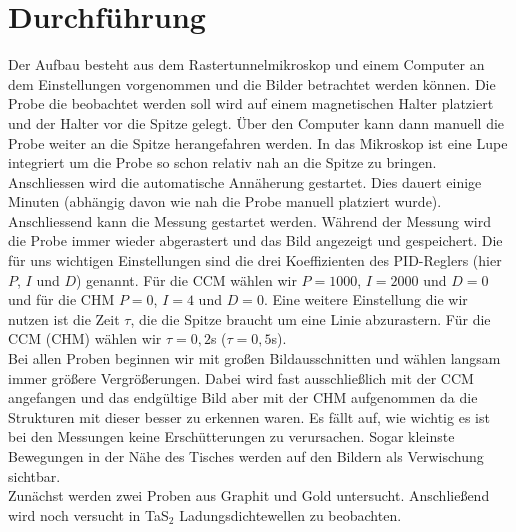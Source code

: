 \section{Durchführung}
Der Aufbau besteht aus dem Rastertunnelmikroskop und einem Computer an dem Einstellungen vorgenommen und die Bilder betrachtet werden können. Die Probe die beobachtet werden soll wird auf einem magnetischen Halter platziert und der Halter vor die Spitze gelegt. Über den Computer kann dann manuell die Probe weiter an die Spitze herangefahren werden. In das Mikroskop ist eine Lupe integriert um die Probe so schon relativ nah an die Spitze zu bringen. Anschliessen wird die automatische Annäherung gestartet. Dies dauert einige Minuten (abhängig davon wie nah die Probe manuell platziert wurde).\\
Anschliessend kann die Messung gestartet werden. Während der Messung wird die Probe immer wieder abgerastert und das Bild angezeigt und gespeichert. Die für uns wichtigen Einstellungen sind die drei Koeffizienten des PID-Reglers (hier $P$, $I$ und $D$) genannt. Für die CCM wählen wir $P=1000$, $I=2000$ und $D=0$ und für die CHM $P=0$, $I=4$ und $D=0$. Eine weitere Einstellung die wir nutzen ist die Zeit $\tau$, die die Spitze braucht um eine Linie abzurastern. Für die CCM (CHM) wählen wir $\tau=0,2$s ($\tau=0,5$s).\\
Bei allen Proben beginnen wir mit großen Bildausschnitten und wählen langsam immer größere Vergrößerungen. Dabei wird fast ausschließlich mit der CCM angefangen und das endgültige Bild aber mit der CHM aufgenommen da die Strukturen mit dieser besser zu erkennen waren. Es fällt auf, wie wichtig es ist bei den Messungen keine Erschütterungen zu verursachen. Sogar kleinste Bewegungen in der Nähe des Tisches werden auf den Bildern als Verwischung sichtbar.\\
Zunächst werden zwei Proben aus Graphit und Gold untersucht. Anschließend wird noch versucht in TaS$_2$  Ladungsdichtewellen zu beobachten. 
